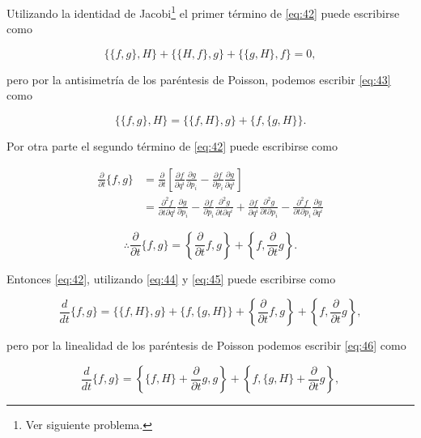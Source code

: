 \documentclass[a4paper,10pt]{article}
\numberwithin{equation}{section}
\begin{document}
Utilizando la identidad de Jacobi\footnote{Ver siguiente problema.} el primer término 
de \eqref{eq:42} puede escribirse como

\begin{equation}
 \{\{f,g\},H\} +  \{\{H,f\},g\} +  \{\{g,H\},f\} = 0,
 \label{eq:43}
\end{equation}

pero por la antisimetría de los paréntesis de Poisson, podemos escribir \eqref{eq:43} 
como

\begin{equation}
  \{\{f,g\},H\} = \{\{f,H\},g\} + \{f,\{g,H\}\}.
 \label{eq:44}
\end{equation}

Por otra parte el segundo término de \eqref{eq:42} puede escribirse como 

\begin{align*}
 \frac{\partial}{\partial t}\{f,g\} &= \frac{\partial}{\partial t}
 \left[\frac{\partial f}{\partial q^i}\frac{\partial g}{\partial p_i} - 
 \frac{\partial f}{\partial p_i}\frac{\partial g}{\partial q^i}\right] \\
 &= \frac{\partial^2 f}{\partial t\partial q^i}\frac{\partial g}{\partial p_i} 
 - \frac{\partial f}{\partial p_i}\frac{\partial^2 g}{\partial t \partial q^i}
 + \frac{\partial f}{\partial q^i}\frac{\partial^2 g}{\partial t \partial p_i}
 - \frac{\partial^2 f}{\partial t\partial p_i}\frac{\partial g}{\partial q^i} 
\end{align*}

\begin{equation}
 \therefore \frac{\partial}{\partial t}\{f,g\} = \left\{\frac{\partial}{\partial t}f,g\right\}
 + \left\{f, \frac{\partial}{\partial t}g\right\}.
 \label{eq:45}
\end{equation}

Entonces \eqref{eq:42}, utilizando \eqref{eq:44} y \eqref{eq:45} puede escribirse como

\begin{equation}
 \frac{d}{dt}\{f,g\} =  \{\{f,H\},g\} + \{f,\{g,H\}\} + \left\{\frac{\partial}{\partial t}f,g\right\}
 + \left\{f, \frac{\partial}{\partial t}g\right\},
 \label{eq:46}
\end{equation}

pero por la linealidad de los paréntesis de Poisson podemos escribir \eqref{eq:46} como

\begin{equation}
  \frac{d}{dt}\{f,g\} = \left\{\{f,H\} + \frac{\partial}{\partial t}g, g\right\} + 
  \left\{f,\{g,H\} + \frac{\partial}{\partial t}g\right\},
  \label{eq:47}
\end{equation}
\end{document}
